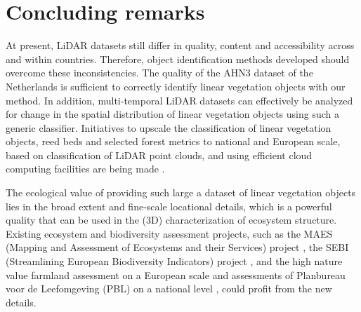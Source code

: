 \section{Concluding remarks}
At present, LiDAR datasets still differ in quality, content and accessibility across and within countries. Therefore, object identification methods developed should overcome these inconsistencies. The quality of the AHN3 dataset of the Netherlands is sufficient to correctly identify linear vegetation objects with our method. In addition, multi-temporal LiDAR datasets can effectively be analyzed for change in the spatial distribution of linear vegetation objects using such a generic classifier. Initiatives to upscale the classification of linear vegetation objects, reed beds and selected forest metrics to national and European scale, based on classification of LiDAR point clouds, and using efficient cloud computing facilities are being made \citep{kissling2017eecolidar}.

The ecological value of providing such large a dataset of linear vegetation objects lies in the broad extent and fine-scale locational details, which is a powerful quality that can be used in the (3D) characterization of ecosystem structure. Existing ecosystem and biodiversity assessment projects, such as the MAES (Mapping and Assessment of Ecosystems and their Services) project \citep{maes2013mapping}, the SEBI (Streamlining European Biodiversity Indicators) project \citep{biala2012streamlining}, and the high nature value farmland assessment \citep{paracchini2008high} on a European scale and assessments of Planbureau voor de Leefomgeving (PBL) on a national level \citep{bouwma2014biodiversiteit}, could profit from the new details.